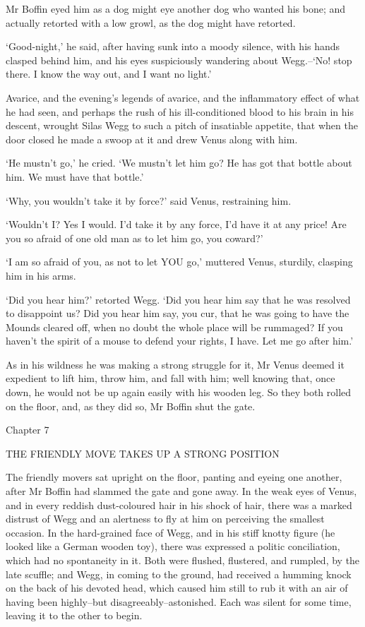 Mr Boffin eyed him as a dog might eye another dog who wanted his bone;
and actually retorted with a low growl, as the dog might have retorted.

‘Good-night,’ he said, after having sunk into a moody silence, with
his hands clasped behind him, and his eyes suspiciously wandering about
Wegg.--‘No! stop there. I know the way out, and I want no light.’

Avarice, and the evening’s legends of avarice, and the inflammatory
effect of what he had seen, and perhaps the rush of his ill-conditioned
blood to his brain in his descent, wrought Silas Wegg to such a pitch of
insatiable appetite, that when the door closed he made a swoop at it and
drew Venus along with him.

‘He mustn’t go,’ he cried. ‘We mustn’t let him go? He has got that
bottle about him. We must have that bottle.’

‘Why, you wouldn’t take it by force?’ said Venus, restraining him.

‘Wouldn’t I? Yes I would. I’d take it by any force, I’d have it at any
price! Are you so afraid of one old man as to let him go, you coward?’

‘I am so afraid of you, as not to let YOU go,’ muttered Venus, sturdily,
clasping him in his arms.

‘Did you hear him?’ retorted Wegg. ‘Did you hear him say that he was
resolved to disappoint us? Did you hear him say, you cur, that he was
going to have the Mounds cleared off, when no doubt the whole place will
be rummaged? If you haven’t the spirit of a mouse to defend your rights,
I have. Let me go after him.’

As in his wildness he was making a strong struggle for it, Mr Venus
deemed it expedient to lift him, throw him, and fall with him; well
knowing that, once down, he would not be up again easily with his wooden
leg. So they both rolled on the floor, and, as they did so, Mr Boffin
shut the gate.



Chapter 7

THE FRIENDLY MOVE TAKES UP A STRONG POSITION


The friendly movers sat upright on the floor, panting and eyeing one
another, after Mr Boffin had slammed the gate and gone away. In the weak
eyes of Venus, and in every reddish dust-coloured hair in his shock of
hair, there was a marked distrust of Wegg and an alertness to fly at him
on perceiving the smallest occasion. In the hard-grained face of Wegg,
and in his stiff knotty figure (he looked like a German wooden toy),
there was expressed a politic conciliation, which had no spontaneity in
it. Both were flushed, flustered, and rumpled, by the late scuffle; and
Wegg, in coming to the ground, had received a humming knock on the back
of his devoted head, which caused him still to rub it with an air of
having been highly--but disagreeably--astonished. Each was silent for
some time, leaving it to the other to begin.

